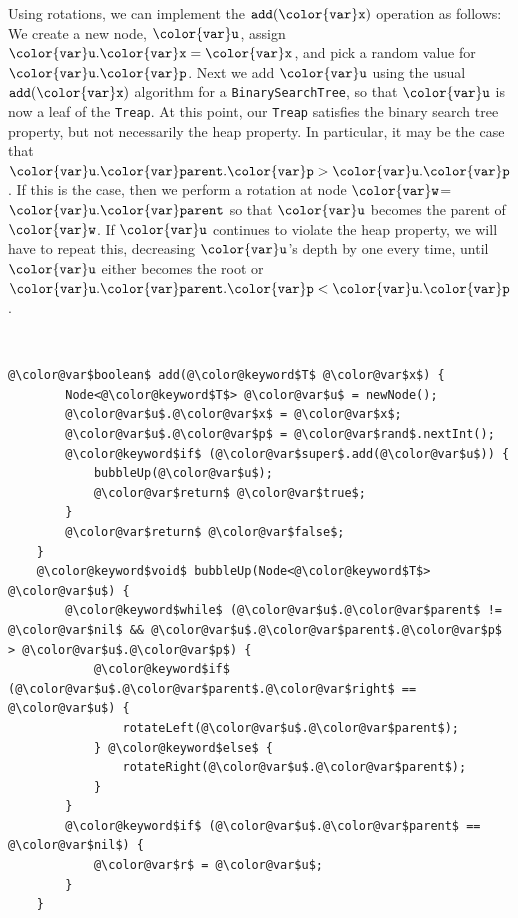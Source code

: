 \documentclass[10pt]{book}
\theoremstyle{plain}
\theoremstyle{definition}
\begin{document}
Using rotations, we can implement the \ensuremath{\mathtt{add({\color{var}x})}} operation as follows:
We create a new node, \ensuremath{\mathtt{{\color{var}u}}}, assign \ensuremath{\mathtt{{\color{var}u}.{\color{var}x}={\color{var}x}}}, and pick a random value
for \ensuremath{\mathtt{{\color{var}u}.{\color{var}p}}}.  Next we add \ensuremath{\mathtt{{\color{var}u}}} using the usual \ensuremath{\mathtt{add({\color{var}x})}} algorithm
for a \texttt{BinarySearchTree}, so that \ensuremath{\mathtt{{\color{var}u}}} is now a leaf of the \texttt{Treap}.
At this point, our \texttt{Treap} satisfies the binary search tree property,
but not necessarily the heap property.  In particular, it may be the
case that \ensuremath{\mathtt{{\color{var}u}.{\color{var}parent}.{\color{var}p} > {\color{var}u}.{\color{var}p}}}.  If this is the case, then we perform a
rotation at node \ensuremath{\mathtt{{\color{var}w}}}=\ensuremath{\mathtt{{\color{var}u}.{\color{var}parent}}} so that \ensuremath{\mathtt{{\color{var}u}}} becomes the parent of \ensuremath{\mathtt{{\color{var}w}}}.
If \ensuremath{\mathtt{{\color{var}u}}} continues to violate the heap property, we will have to repeat this, decreasing \ensuremath{\mathtt{{\color{var}u}}}'s depth by one every time, until
\ensuremath{\mathtt{{\color{var}u}}} either becomes the root or $\ensuremath{\mathtt{{\color{var}u}.{\color{var}parent}.{\color{var}p}}} < \ensuremath{\mathtt{{\color{var}u}.{\color{var}p}}}$.


 \ \vspace{.5ex}\begin{Verbatim}[gobble=1,tabsize=2,frame=single,framerule=1.2pt,commandchars=\\@\$,label=\texttt{Treap},labelposition=topline]
	@\color@var$boolean$ add(@\color@keyword$T$ @\color@var$x$) {
		Node<@\color@keyword$T$> @\color@var$u$ = newNode();
		@\color@var$u$.@\color@var$x$ = @\color@var$x$;
		@\color@var$u$.@\color@var$p$ = @\color@var$rand$.nextInt();
		@\color@keyword$if$ (@\color@var$super$.add(@\color@var$u$)) {
			bubbleUp(@\color@var$u$);
			@\color@var$return$ @\color@var$true$;
		}
		@\color@var$return$ @\color@var$false$;
	}
	@\color@keyword$void$ bubbleUp(Node<@\color@keyword$T$> @\color@var$u$) {
		@\color@keyword$while$ (@\color@var$u$.@\color@var$parent$ != @\color@var$nil$ && @\color@var$u$.@\color@var$parent$.@\color@var$p$ > @\color@var$u$.@\color@var$p$) {
			@\color@keyword$if$ (@\color@var$u$.@\color@var$parent$.@\color@var$right$ == @\color@var$u$) {
				rotateLeft(@\color@var$u$.@\color@var$parent$);
			} @\color@keyword$else$ {
				rotateRight(@\color@var$u$.@\color@var$parent$);
			}
		}
		@\color@keyword$if$ (@\color@var$u$.@\color@var$parent$ == @\color@var$nil$) {
			@\color@var$r$ = @\color@var$u$;
		}
	}
\end{Verbatim}
\end{document}
